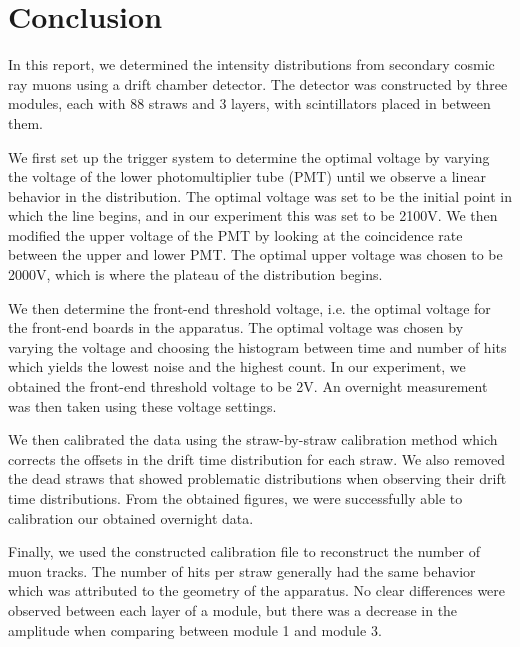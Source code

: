 \documentclass[a4paper]{report}
\numberwithin{equation}{section}
\begin{document}
\chapter{Conclusion} \label{chap:concl}

In this report, we determined the intensity distributions from secondary cosmic ray muons using a drift chamber detector. 
The detector was constructed by three modules, each with 88 straws and 3 layers, with scintillators placed in between them. \par 

We first set up the trigger system to determine the optimal voltage by varying the voltage of the lower photomultiplier tube (PMT) 
until we observe a linear behavior in the distribution. The optimal voltage was set to be the initial point in which the line begins, and
in our experiment this was set to be 2100V. We then modified the upper voltage of the PMT by looking at the coincidence rate between the 
upper and lower PMT. The optimal upper voltage was chosen to be 2000V, which is where the plateau of the distribution begins. \par 

We then determine the front-end threshold voltage, i.e. the optimal voltage for the front-end boards in the apparatus. 
The optimal voltage was chosen by varying the voltage and choosing the histogram between time and number of hits 
which yields the lowest noise and the highest count. In our experiment, we obtained the front-end threshold voltage to be 
2V. An overnight measurement was then taken using these voltage settings.\par 

We then calibrated the data using the straw-by-straw calibration method which corrects the offsets in the drift time distribution
for each straw. We also removed the dead straws that showed problematic distributions when observing their drift time distributions. 
From the obtained figures, we were successfully able to calibration our obtained overnight data. \par 

Finally, we used the constructed calibration file to reconstruct the number of muon tracks. The number of hits per straw generally 
had the same behavior which was attributed to the geometry of the apparatus. No clear differences were observed between each layer 
of a module, but there was a decrease in the amplitude when comparing between module 1 and module 3. \par 
\end{document}
